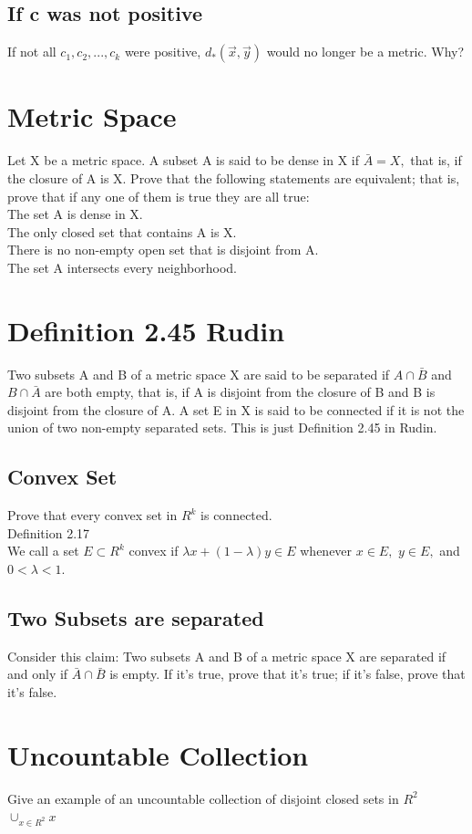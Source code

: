 \subsection{If c was not positive} 
If not all $c_1,c_2, ...,c_k$ were positive, $d_{*}(\vec{x}, \vec{y})$ would no longer be a metric. Why? 
\section{Metric Space}
Let X be a metric space. A subset A is said to be dense in X if $\bar{A}=X,$ that is, if the closure of A is X. Prove that the following statements are equivalent; that is, prove that if any one of them is true they are all true:\\ 
The set A is dense in X. \\ 
The only closed set that contains A is X. \\ 
There is no non-empty open set that is disjoint from A. \\ 
The set A intersects every neighborhood. \\ 
\section{Definition 2.45 Rudin}
Two subsets A and B of a metric space X are said to be separated if $A \cap \bar{B}$ and $B \cap \bar{A}$ are both empty, that is, if A is disjoint from the closure of B and B is disjoint from the closure of A. A set E in X is said to be connected if it is not the union of two non-empty separated sets. This is just Definition 2.45 in Rudin. \\ 
\subsection{Convex Set}
Prove that every convex set in $R^k$ is connected. \\ 
Definition 2.17 \\ 
We call a set $E \subset R^k$ convex if $\lambda x + (1- \lambda) y \in E$ whenever $x \in E,$ $y \in E,$ and $ 0< \lambda <1.$
\subsection{Two Subsets are separated}
Consider this claim: Two subsets A and B of a metric space X are separated if and only if $\bar{A} \cap \bar{B}$ is empty. If it's true, prove that it's true; if it's false, prove that it's false. \\ 
\section{Uncountable Collection}
Give an example of an uncountable collection of disjoint closed sets in $R^2$ \\ 
$\cup_{x \in R^2} x$
